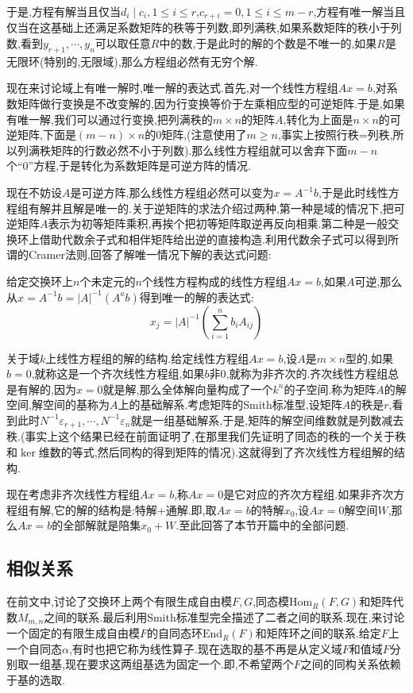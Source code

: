 于是,方程有解当且仅当$d_i\mid c_i,1\le i\le r$,$c_{r+i}=0,1\le i\le m-r$,方程有唯一解当且仅当在这基础上还满足系数矩阵的秩等于列数,即列满秩,如果系数矩阵的秩小于列数,看到$y_{r+1},\cdots,y_n$可以取任意$R$中的数,于是此时的解的个数是不唯一的,如果$R$是无限环(特别的,无限域),那么方程组必然有无穷个解.

现在来讨论域上有唯一解时,唯一解的表达式.首先,对一个线性方程组$Ax=b$,对系数矩阵做行变换是不改变解的,因为行变换等价于左乘相应型的可逆矩阵.于是,如果有唯一解,我们可以通过行变换,把列满秩的$m\times n$的矩阵$A$,转化为上面是$n\times n$的可逆矩阵,下面是$(m-n)\times n$的0矩阵,(注意使用了$m\ge n$,事实上按照行秩=列秩,所以列满秩矩阵的行数必然不小于列数).那么线性方程组就可以舍弃下面$m-n$个“0”方程,于是转化为系数矩阵是可逆方阵的情况.

现在不妨设$A$是可逆方阵,那么线性方程组必然可以变为$x=A^{-1}b$,于是此时线性方程组有解并且解是唯一的.关于逆矩阵的求法介绍过两种,第一种是域的情况下,把可逆矩阵$A$表示为初等矩阵乘积,再挨个把初等矩阵取逆再反向相乘.第二种是一般交换环上借助代数余子式和相伴矩阵给出逆的直接构造.利用代数余子式可以得到所谓的Cramer法则,回答了解唯一情况下解的表达式问题:

给定交换环上$n$个未定元的$n$个线性方程构成的线性方程组$Ax=b$,如果$A$可逆,那么从$x=A^{-1}b=|A|^{-1}(A^ab)$得到唯一的解的表达式:
$$x_j=|A|^{-1}\left(\sum_{i=1}^{n}b_iA_{ij}\right)$$

关于域$k$上线性方程组的解的结构.给定线性方程组$Ax=b$,设$A$是$m\times n$型的,如果$b=0$,就称这是一个齐次线性方程组,如果$b$非0,就称为非齐次的.齐次线性方程组总是有解的,因为$x=0$就是解,那么全体解向量构成了一个$k^n$的子空间.称为矩阵$A$的解空间,解空间的基称为$A$上的基础解系.考虑矩阵的Smith标准型,设矩阵$A$的秩是$r$,看到此时$N^{-1}\varepsilon_{r+1},\cdots,N^{-1}\varepsilon_{n}$就是一组基础解系,于是,矩阵的解空间维数就是列数减去秩.(事实上这个结果已经在前面证明了,在那里我们先证明了同态的秩的一个关于秩和$\ker$维数的等式,然后同构的得到矩阵的情况).这就得到了齐次线性方程组解的结构.

现在考虑非齐次线性方程组$Ax=b$,称$Ax=0$是它对应的齐次方程组.如果非齐次方程组有解,它的解的结构是:特解+通解.即,取$Ax=b$的特解$x_0$,设$Ax=0$解空间$W$,那么$Ax=b$的全部解就是陪集$x_0+W$.至此回答了本节开篇中的全部问题.
\newpage
\subsection{相似关系}

在前文中,讨论了交换环上两个有限生成自由模$F,G$,同态模$\mathrm{Hom}_R(F,G)$和矩阵代数$M_{m,n}$之间的联系.最后利用Smith标准型完全描述了二者之间的联系.现在,来讨论一个固定的有限生成自由模$F$的自同态环$\mathrm{End}_R(F)$和矩阵环之间的联系.给定$F$上一个自同态$\alpha$,有时也把它称为线性算子.现在选取的基不再是从定义域$F$和值域$F$分别取一组基,现在要求这两组基选为固定一个.即,不希望两个$F$之间的同构关系依赖于基的选取.


